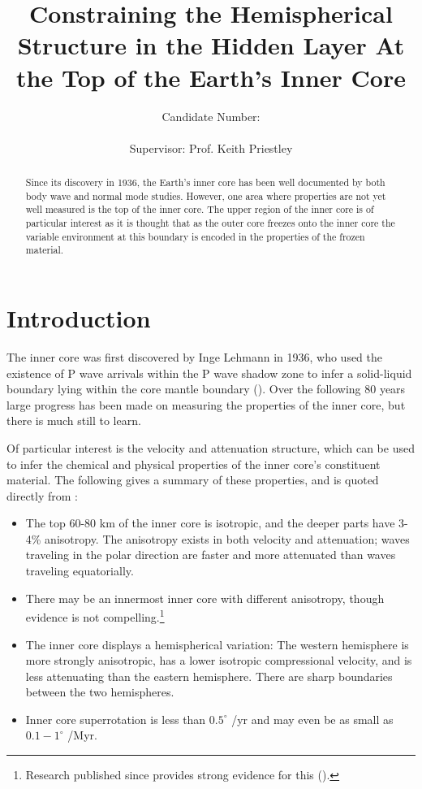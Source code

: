 \documentclass[11pt,a4paper]{article}
\begin{document}
\title{Constraining the Hemispherical Structure in the Hidden Layer At the Top of the Earth's Inner Core}
\author{Candidate Number: \\  \\ Supervisor: Prof. Keith Priestley}
\maketitle

\begin{abstract}
Since its discovery in 1936, the Earth's inner core has been well documented by both body wave and normal mode studies. However, one area where properties are not yet well measured is the top of the inner core. The upper region of the inner core is of particular interest as it is thought that as the outer core freezes onto the inner core the variable environment at this boundary is encoded in the properties of the frozen material. 
\end{abstract}

\tableofcontents

\newpage
\section{Introduction}
The inner core was first discovered by Inge Lehmann in 1936, who used the existence of P wave arrivals within the P wave shadow zone to infer a solid-liquid boundary lying within the core mantle boundary (\cite{Lehmann}). Over the following 80 years large progress has been made on measuring the properties of the inner core, but there is much still to learn.

Of particular interest is the velocity and attenuation structure, which can be used to infer the chemical and physical properties of the inner core's constituent material. The following gives a summary of these properties, and is quoted directly from \cite{Deuss2014}:
\begin{itemize}
	\item The top 60-80 km of the inner core is isotropic, and the deeper parts have 3-4\% anisotropy. The anisotropy exists in both velocity and attenuation; waves traveling in the polar direction are faster and more attenuated than waves traveling equatorially.
	\item There may be an innermost inner core with different anisotropy, though evidence is not compelling.\footnote{Research published since \cite{Deuss2014} provides strong evidence for this (\cite{Wang2015}).}
	\item The inner core displays a hemispherical variation: The western hemisphere is more strongly anisotropic, has a lower isotropic compressional velocity, and is less attenuating than the eastern hemisphere. There are sharp boundaries between the two hemispheres.
	\item Inner core superrotation is less than $0.5^{\circ}$ /yr and may even be as small as $0.1-1^{\circ}$ /Myr.
\end{itemize}
\end{document}
